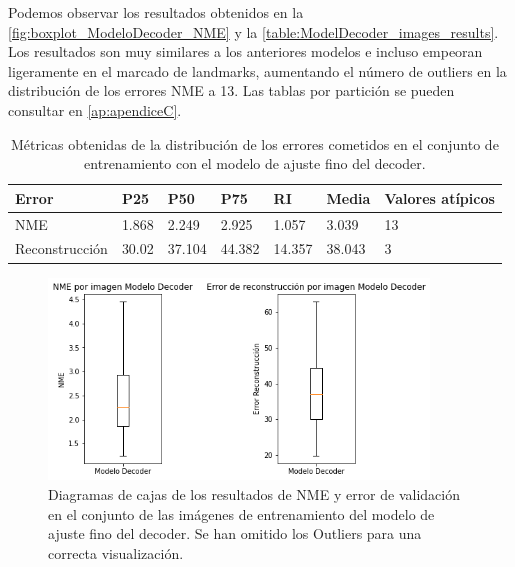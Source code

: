         \noindent Podemos observar los resultados obtenidos en la \autoref{fig:boxplot_ModeloDecoder_NME} y la \autoref{table:ModelDecoder_images_results}. Los resultados son muy similares a los anteriores modelos e incluso empeoran ligeramente en el marcado de landmarks, aumentando el número de outliers en la distribución de los errores NME a 13. Las tablas por partición se pueden consultar en \autoref{ap:apendiceC}.

    \begin{table}[!ht]
            \centering
            \caption{Métricas obtenidas de la distribución de los errores cometidos en el conjunto de entrenamiento con el modelo de ajuste fino del decoder.}
            \begin{tabular}{|l|l|l|l|l|l|l|}
            \hline
            \cellcolor{gray!25}\textbf{Error} & \cellcolor{gray!25}\textbf{P25} & \cellcolor{gray!25}\textbf{P50} & \cellcolor{gray!25}\textbf{P75} & \cellcolor{gray!25}\textbf{RI} & \cellcolor{gray!25}\textbf{Media} & \cellcolor{gray!25}\textbf{Valores atípicos}\\ \hline
                NME & 1.868 & 2.249 & 2.925 & 1.057 & 3.039 & 13 \\ \hline
                Reconstrucción & 30.02 & 37.104 & 44.382 & 14.357 & 38.043 & 3 \\ \hline
            \end{tabular}
            \label{table:ModelDecoder_images_results}
        \end{table}

        \begin{figure}[H]
            \centering
            \includegraphics[width=0.9\textwidth]{img/boxplot_decoder.png}
            \caption{Diagramas de cajas de los resultados de NME y error de validación en el conjunto de las imágenes de entrenamiento del modelo de ajuste fino del decoder. Se han omitido los Outliers para una correcta visualización.}
            \label{fig:boxplot_ModeloDecoder_NME}
        \end{figure}

